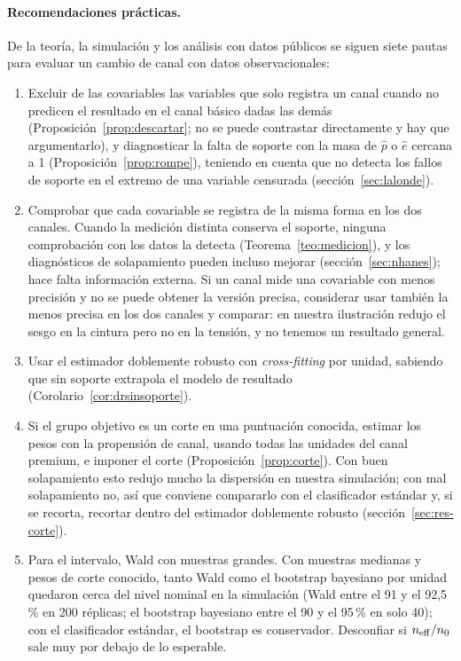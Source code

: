 \paragraph{Recomendaciones prácticas.} De la teoría, la simulación y los análisis con datos públicos se siguen siete pautas para evaluar un cambio de canal con datos observacionales:
\begin{enumerate}
  \item Excluir de las covariables las variables que solo registra un canal cuando no predicen el resultado en el canal básico dadas las demás (Proposición~\ref{prop:descartar}; no se puede contrastar directamente y hay que argumentarlo), y diagnosticar la falta de soporte con la masa de $\hat p$ o $\hat e$ cercana a 1 (Proposición~\ref{prop:rompe}), teniendo en cuenta que no detecta los fallos de soporte en el extremo de una variable censurada (sección~\ref{sec:lalonde}).
  \item Comprobar que cada covariable se registra de la misma forma en los dos canales. Cuando la medición distinta conserva el soporte, ninguna comprobación con los datos la detecta (Teorema~\ref{teo:medicion}), y los diagnósticos de solapamiento pueden incluso mejorar (sección~\ref{sec:nhanes}); hace falta información externa. Si un canal mide una covariable con menos precisión y no se puede obtener la versión precisa, considerar usar también la menos precisa en los dos canales y comparar: en nuestra ilustración redujo el sesgo en la cintura pero no en la tensión, y no tenemos un resultado general.
  \item Usar el estimador doblemente robusto con \emph{cross-fitting} por unidad, sabiendo que sin soporte extrapola el modelo de resultado (Corolario~\ref{cor:drsinsoporte}).
  \item Si el grupo objetivo es un corte en una puntuación conocida, estimar los pesos con la propensión de canal, usando todas las unidades del canal premium, e imponer el corte (Proposición~\ref{prop:corte}). Con buen solapamiento esto redujo mucho la dispersión en nuestra simulación; con mal solapamiento no, así que conviene compararlo con el clasificador estándar y, si se recorta, recortar dentro del estimador doblemente robusto (sección~\ref{sec:res-corte}).
  \item Para el intervalo, Wald con muestras grandes. Con muestras medianas y pesos de corte conocido, tanto Wald como el bootstrap bayesiano por unidad quedaron cerca del nivel nominal en la simulación (Wald entre el 91 y el 92,5\,\% en 200 réplicas; el bootstrap bayesiano entre el 90 y el 95\,\% en solo 40); con el clasificador estándar, el bootstrap es conservador. Desconfiar si $n_{\mathrm{eff}}/n_0$ sale muy por debajo de lo esperable.

\end{enumerate}
